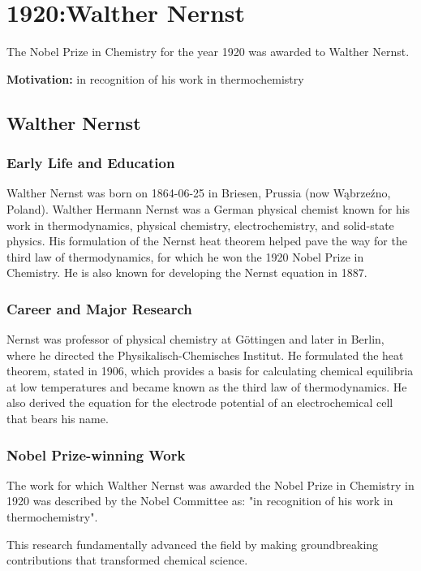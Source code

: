 \chapter{1920:Walther Nernst}
\label{chap:chemistry1920}

The Nobel Prize in Chemistry for the year 1920 was awarded to Walther Nernst.

\textbf{Motivation:}
in recognition of his work in thermochemistry

\section{Walther Nernst}

\subsection*{Early Life and Education}

Walther Nernst was born on 1864-06-25 in Briesen, Prussia (now Wąbrzeźno, Poland).
Walther Hermann Nernst was a German physical chemist known for his work in thermodynamics, physical chemistry, electrochemistry, and solid-state physics. His formulation of the Nernst heat theorem helped pave the way for the third law of thermodynamics, for which he won the 1920 Nobel Prize in Chemistry. He is also known for developing the Nernst equation in 1887.

\subsection*{Career and Major Research}

Nernst was professor of physical chemistry at Göttingen and later in Berlin, where he directed the Physikalisch-Chemisches Institut. He formulated the heat theorem, stated in 1906, which provides a basis for calculating chemical equilibria at low temperatures and became known as the third law of thermodynamics. He also derived the equation for the electrode potential of an electrochemical cell that bears his name.

\subsection*{Nobel Prize-winning Work}

The work for which Walther Nernst was awarded the Nobel Prize in Chemistry in 1920 was described by the Nobel Committee as: "in recognition of his work in thermochemistry".

This research fundamentally advanced the field by making groundbreaking contributions that transformed chemical science.

